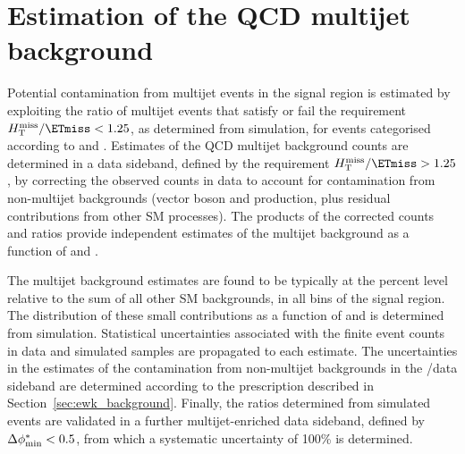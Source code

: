 \section{Estimation of the QCD multijet background}
\label{sec:qcd_background}


Potential contamination from multijet events in the signal region is
estimated by exploiting the ratio of multijet events that satisfy or
fail the requirement $\HTmiss/\ETmiss < 1.25$, as determined from
simulation, for events categorised according to \njet and
\scalht. Estimates of the QCD multijet background counts are
determined in a data sideband, defined by the requirement
$\HTmiss/\ETmiss > 1.25$, by correcting the observed counts in data to
account for contamination from non-multijet backgrounds (vector boson
and \ttbar production, plus residual contributions from other SM
processes). The products of the corrected counts and ratios provide
independent estimates of the multijet background as a function of
\njet and \scalht.

The multijet background estimates are found to be typically at the
percent level relative to the sum of all other SM backgrounds, in all
bins of the signal region. The distribution of these small
contributions as a function of \nb and \mht is determined from
simulation. Statistical uncertainties associated with the finite event
counts in data and simulated samples are propagated to each
estimate. The uncertainties in the estimates of the contamination from
non-multijet backgrounds in the \HTmiss/\ETmiss data sideband are
determined according to the prescription described in
Section~\ref{sec:ewk_background}. Finally, the ratios determined from
simulated events are validated in a further multijet-enriched data
sideband, defined by $\Delta\phi^{*}_{\rm min} < 0.5$, from which a systematic
uncertainty of 100\% is determined.

